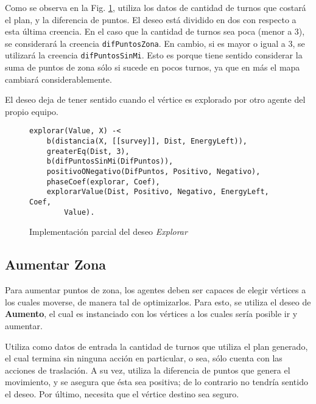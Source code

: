\documentclass[oneside]{book}
\begin{document}
Como se observa en la Fig. \ref{fig:deseoExplorar}, utiliza los datos de cantidad de 
turnos que costará el plan, y la diferencia de puntos.
El deseo está dividido en dos con respecto a esta última creencia. En el caso que la
cantidad de turnos sea poca (menor a 3), se considerará la creencia 
\texttt{difPuntosZona}. En cambio, si es mayor o igual a 3, se utilizará la creencia
\texttt{difPuntosSinMi}. Esto es porque tiene sentido considerar la suma de puntos
de zona sólo si sucede en pocos turnos, ya que en más el mapa cambiará 
considerablemente. 

El deseo deja de tener sentido cuando el vértice es explorado por otro agente del propio
equipo. 

\begin{figure}
\begin{verbatim}
explorar(Value, X) -<
    b(distancia(X, [[survey]], Dist, EnergyLeft)),
    greaterEq(Dist, 3),
    b(difPuntosSinMi(DifPuntos)),
    positivoONegativo(DifPuntos, Positivo, Negativo),
    phaseCoef(explorar, Coef),
    explorarValue(Dist, Positivo, Negativo, EnergyLeft, Coef,
    	Value).
\end{verbatim}
\caption{Implementación parcial del deseo \emph{Explorar}}
\label{fig:deseoExplorar}
\end{figure}
% 

\subsection{Aumentar Zona}

Para aumentar puntos de zona, los agentes deben ser capaces de elegir vértices a los 
cuales moverse, de manera tal de optimizarlos. Para esto, se utiliza el deseo de 
\textbf{Aumento}, el cual es instanciado con los vértices a los cuales sería posible ir y 
aumentar. 

Utiliza como datos de entrada la cantidad de turnos que utiliza el plan generado, el 
cual termina sin ninguna acción en particular, o sea, sólo cuenta con las acciones 
de traslación. A su vez, utiliza la diferencia de puntos que genera el movimiento, y 
se asegura que ésta sea positiva; de lo contrario no tendría sentido el deseo. Por 
último, necesita que el vértice destino sea seguro.
\end{document}
